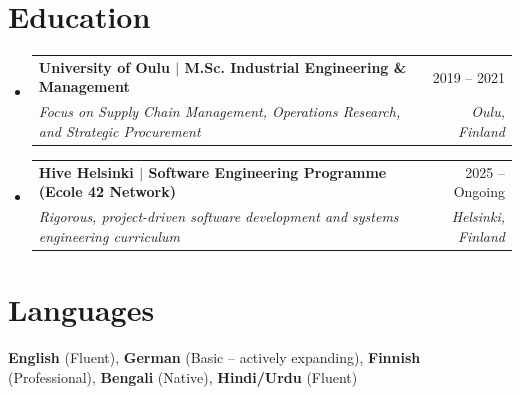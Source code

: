 \documentclass[a4paper,11pt]{article}
\makeatletter
\newcommand{\resumeSubheading}[4]{
  \vspace{-2pt}\item
    \begin{tabular*}{0.97\textwidth}[t]{l@{\extracolsep{\fill}}r}
      \textbf{#1} & \small #2 \\
      \textit{\small#3} & \textit{\small #4} \\
    \end{tabular*}\vspace{-5pt}
}
\newcommand{\resumeSubHeadingListStart}{\begin{itemize}[leftmargin=0.15in, label={}]}
\newcommand{\resumeSubHeadingListEnd}{\end{itemize}\vspace{-5pt}}
\makeatother
\begin{document}
\vspace{-4pt}

\section{Education}
\resumeSubHeadingListStart
  \resumeSubheading
    {University of Oulu $\vert{}$ \normalfont M.Sc. Industrial Engineering \& Management}{2019 -- 2021}
    {Focus on Supply Chain Management, Operations Research, and Strategic Procurement}{Oulu, Finland}

  \resumeSubheading
    {Hive Helsinki $\vert{}$ \normalfont Software Engineering Programme (Ecole 42 Network)}{2025 -- Ongoing}
    {Rigorous, project-driven software development and systems engineering curriculum}{Helsinki, Finland}
\resumeSubHeadingListEnd

\vspace{-4pt}

\section{Languages}
\begin{itemize}[leftmargin=0.15in, label={}, itemsep=0pt, topsep=1pt]
\small{\item{
\textbf{English} (Fluent), \textbf{German} (Basic -- actively expanding), \textbf{Finnish} (Professional), \textbf{Bengali} (Native), \textbf{Hindi/Urdu} (Fluent)
}}
\end{itemize}
\end{document}
